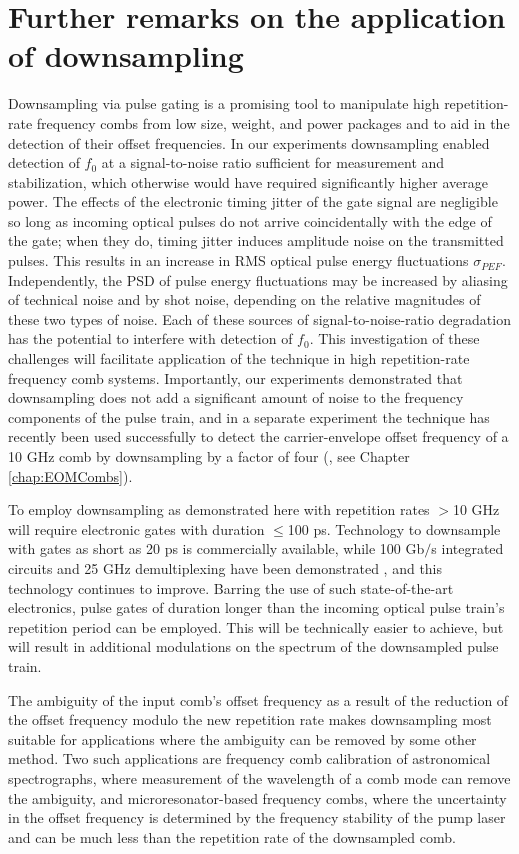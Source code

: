 \section{Further remarks on the application of downsampling}\label{sec:PPConclusion}
Downsampling via pulse gating is a promising tool to manipulate high repetition-rate frequency combs from low size, weight, and power packages and to aid in the detection of their offset frequencies. In our experiments downsampling enabled detection of $f_0$ at a signal-to-noise ratio sufficient for measurement and stabilization, which otherwise would have required significantly higher average power. The effects of the electronic timing jitter of the gate signal are negligible so long as incoming optical pulses do not arrive coincidentally with the edge of the gate; when they do, timing jitter induces amplitude noise on the transmitted pulses. This results in an increase in RMS optical pulse energy fluctuations $\sigma_{PEF}$. Independently, the PSD of pulse energy fluctuations may be increased by aliasing of technical noise and by shot noise, depending on the relative magnitudes of these two types of noise. Each of these sources of signal-to-noise-ratio degradation has the potential to interfere with detection of $f_0$. This investigation of these challenges will facilitate application of the technique in high repetition-rate frequency comb systems. Importantly, our experiments demonstrated that downsampling does not add a significant amount of noise to the frequency components of the pulse train, and in a separate experiment the technique has recently been used successfully to detect the carrier-envelope offset frequency of a 10 GHz comb by downsampling by a factor of four (\cite{Beha2017}, see Chapter \ref{chap:EOMCombs}).

To employ downsampling as demonstrated here with repetition rates $>$10 GHz will require electronic gates with duration $\leq$100 ps. Technology to downsample with gates as short as 20 ps is commercially available, while 100 Gb$/$s integrated circuits and 25 GHz demultiplexing have been demonstrated \cite{Driad2011,Ferenci2012}, and this technology continues to improve. Barring the use of such state-of-the-art electronics, pulse gates of duration longer than the incoming optical pulse train's repetition period can be employed.  This will be technically easier to achieve, but will result in additional modulations on the spectrum of the downsampled pulse train.

The ambiguity of the input comb's offset frequency as a result of the reduction of the offset frequency modulo the new repetition rate makes downsampling most suitable for applications where the ambiguity can be removed by some other method.  Two such applications are frequency comb calibration of astronomical spectrographs, where measurement of the wavelength of a comb mode can remove the ambiguity, and microresonator-based frequency combs, where the uncertainty in the offset frequency is determined by the frequency stability of the pump laser and can be much less than the repetition rate of the downsampled comb. 




